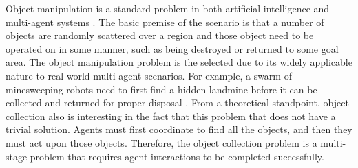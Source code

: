 Object manipulation is a standard problem in both artificial intelligence  and multi-agent systems .  The basic premise of the scenario is that a number of objects are randomly scattered over a region and those object need to be operated on in some manner, such as being destroyed or returned to some goal area.  The object manipulation problem is the selected due to its widely applicable nature to real-world multi-agent scenarios.  For example, a swarm of minesweeping robots need to first find a hidden landmine before it can be collected and returned for proper disposal .  From a theoretical standpoint, object collection also is interesting in the fact that this problem that does not have a trivial solution.  Agents must first coordinate to find all the objects, and then they must act upon those objects.  Therefore, the object collection problem is a multi-stage problem that requires agent interactions to be completed successfully. 
